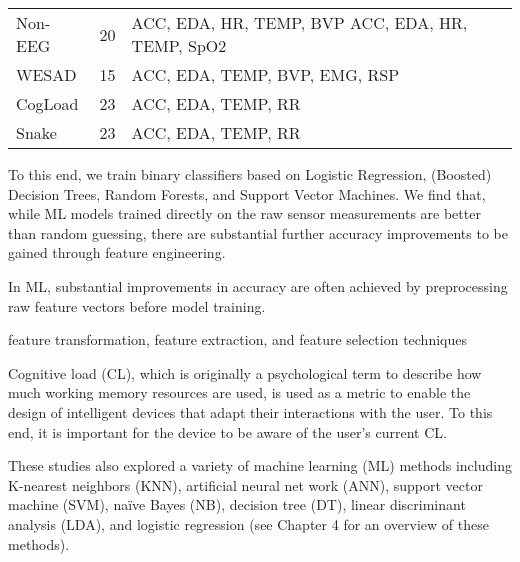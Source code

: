 \begin{table}[h]
\begin{tabular}{lcp{9cm}}
        Non-EEG               & 20                & ACC, EDA, HR, TEMP, BVP ACC, EDA, HR, TEMP, SpO2                             \\
        WESAD                 & 15                & ACC, EDA, TEMP, BVP, EMG, RSP                                                \\ \midrule
        CogLoad               & 23                & ACC, EDA, TEMP, RR                                                           \\
        Snake                 & 23                & ACC, EDA, TEMP, RR                                                           \\ \bottomrule
    \end{tabular}
\end{table}




To this end, we train binary classifiers based on Logistic Regression, (Boosted)
Decision Trees, Random Forests, and Support Vector Machines. We find that, while
ML models trained directly on the raw sensor measurements are better than random
guessing, there are substantial further accuracy improvements to be gained
through feature engineering.

In ML, substantial improvements in accuracy are often achieved by preprocessing
raw feature vectors before model training.

feature transformation, feature extraction, and feature selection techniques

Cognitive load (CL), which is originally a psychological term to describe how
much working memory resources are used, is used as a metric to enable the design
of intelligent devices that adapt their interactions with the user. To this end,
it is important for the device to be aware of the user’s current CL.

These studies also explored a variety of machine learning (ML) methods including
K-nearest neighbors (KNN), artificial neural net­ work (ANN), support vector
machine (SVM), naïve Bayes (NB), decision tree (DT), linear discriminant
analysis (LDA), and logistic regression (see Chapter 4 for an overview of these
methods).